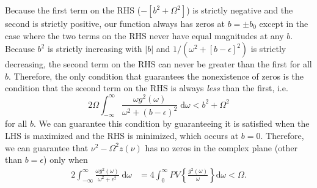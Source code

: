 \documentclass{article}
\begin{document}
\begin{itemize}
{\begin{equation}
    \end{equation}
    Because the first term on the RHS ($-[b^2 + \Omega^2]$) is strictly negative and the second is strictly positive, our function always has zeros at $b = \pm b_0$ except in the case where the two terms on the RHS never have equal magnitudes at any $b$. Because $b^2$ is strictly increasing with $|b|$ and $1/(\omega^2 + [b - \epsilon]^2)$ is strictly decreasing, the second term on the RHS can never be greater than the first for all $b$. Therefore, the only condition that guarantees the nonexistence of zeros is the condition that the sceond term on the RHS is always \textit{less} than the first, i.e.
    \begin{equation}
    2\Omega\int_{-\infty}^\infty\frac{\omega g^2(\omega)}{\omega^2 + (b - \epsilon)^2}\;\mathrm{d}\omega < b^2 + \Omega^2
    \end{equation}
    for all $b$. We can guarantee this condition by guaranteeing it is satisfied when the LHS is maximized and the RHS is minimized, which occurs at $b = 0$. Therefore, we can guarantee that $\nu^2 - \Omega^2z(\nu)$ has no zeros in the complex plane (other than $b = \epsilon$) only when 
    \begin{equation}\label{eq:consistencyCondition1}
    \begin{split}
    2\int_{-\infty}^\infty \frac{\omega g^2(\omega)}{\omega^2 + \epsilon^2}\;\mathrm{d}\omega &= 4\int_0^\infty PV\left\{\frac{g^2(\omega)}{\omega}\right\}\mathrm{d}\omega < \Omega.
    \end{split}
    \end{equation}
    }
\end{itemize}
\end{document}
